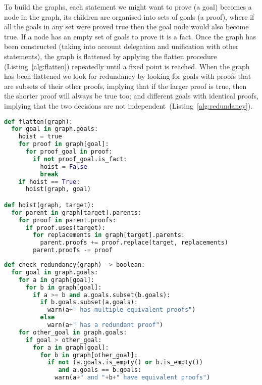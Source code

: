\documentclass[a4paper]{scrartcl}
\begin{document}
To build the graphs, each statement we might want to prove (a goal) becomes a
node in the graph, its children are organised into sets of goals (a proof),
where if all the goals in any set were proved true then the goal node would also
become true. If a node has an empty set of goals to prove it is a fact. Once the
graph has been constructed (taking into account delegation and unification with
other statements), the graph is flattened by applying the flatten procedure
(Listing~\ref{alg:flatten}) repeatedly until a fixed point is reached. When the
graph has been flattened we look for redundancy by looking for goals with proofs
that are subsets of their other proofs, implying that if the larger proof is
true, then the shorter proof will always be true too; and different goals with
identical proofs, implying that the two decisions are not
independent~(Listing~\ref{alg:redundancy}).

\begin{lstlisting}[language=Python,float,caption={Procedure for flattening the redundancy graph.},label={alg:flatten}]
def flatten(graph):
  for goal in graph.goals:
    hoist = true
    for proof in graph[goal]:
      for proof_goal in proof:
        if not proof_goal.is_fact:
          hoist = False
          break
    if hoist == True:
      hoist(graph, goal)

def hoist(graph, target):
  for parent in graph[target].parents:
    for proof in parent.proofs:
      if proof.uses(target):
        for replacements in graph[target].parents:
          parent.proofs += proof.replace(target, replacements)
        parent.proofs -= proof
\end{lstlisting}

\begin{lstlisting}[language=Python,float,caption={Procedure to check for redundancy.},label={alg:redundancy}]
def check_redundancy(graph) -> boolean:
  for goal in graph.goals:
    for a in graph[goal]:
      for b in graph[goal]:
        if a >= b and a.goals.subset(b.goals):
          if b.goals.subset(a.goals):
            warn(a+" has multiple equivalent proofs") 
          else
            warn(a+" has a redundant proof")
    for other_goal in graph.goals:
      if goal > other_goal:
        for a in graph[goal]:
          for b in graph[other_goal]:
            if not (a.goals.is_empty() or b.is_empty())
               and a.goals == b.goals:
              warn(a+" and "+b+" have equivalent proofs")
\end{lstlisting}
\end{document}
